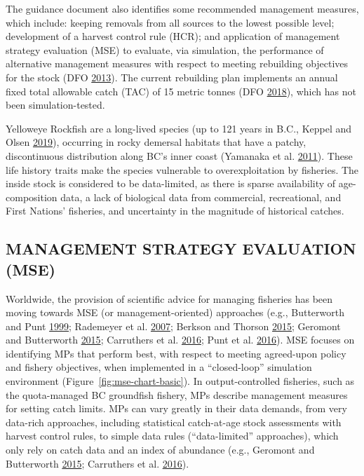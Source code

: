 \documentclass[11pt]{book}
\begin{document}
The guidance document also identifies some recommended management measures, which include: keeping removals from all sources to the lowest possible level; development of a harvest control rule (HCR); and application of management strategy evaluation (MSE) to evaluate, via simulation, the performance of alternative management measures with respect to meeting rebuilding objectives for the stock (DFO \protect\hyperlink{ref-dfo2013}{2013}). The current rebuilding plan implements an annual fixed total allowable catch (TAC) of 15 metric tonnes (DFO \protect\hyperlink{ref-ifmp2018}{2018}), which has not been simulation-tested.

Yelloweye Rockfish are a long-lived species (up to 121 years in B.C., Keppel and Olsen \protect\hyperlink{ref-keppel2019}{2019}), occurring in rocky demersal habitats that have a patchy, discontinuous distribution along BC's inner coast (Yamanaka et al. \protect\hyperlink{ref-yamanaka2011}{2011}). These life history traits make the species vulnerable to overexploitation by fisheries. The inside stock is considered to be data-limited, as there is sparse availability of age-composition data, a lack of biological data from commercial, recreational, and First Nations' fisheries, and uncertainty in the magnitude of historical catches.

\hypertarget{sec:introduction-mse}{%
\subsection{MANAGEMENT STRATEGY EVALUATION (MSE)}\label{sec:introduction-mse}}

Worldwide, the provision of scientific advice for managing fisheries has been moving towards MSE (or management-oriented) approaches (e.g., Butterworth and Punt \protect\hyperlink{ref-butterworth1999}{1999}; Rademeyer et al. \protect\hyperlink{ref-rademeyer2007}{2007}; Berkson and Thorson \protect\hyperlink{ref-berkson2015}{2015}; Geromont and Butterworth \protect\hyperlink{ref-geromont2015}{2015}; Carruthers et al. \protect\hyperlink{ref-carruthers2016}{2016}; Punt et al. \protect\hyperlink{ref-punt2016}{2016}). MSE focuses on identifying MPs that perform best, with respect to meeting agreed-upon policy and fishery objectives, when implemented in a ``closed-loop'' simulation environment (Figure~\ref{fig:mse-chart-basic}). In output-controlled fisheries, such as the quota-managed BC groundfish fishery, MPs describe management measures for setting catch limits. MPs can vary greatly in their data demands, from very data-rich approaches, including statistical catch-at-age stock assessments with harvest control rules, to simple data rules (``data-limited'' approaches), which only rely on catch data and an index of abundance (e.g., Geromont and Butterworth \protect\hyperlink{ref-geromont2015}{2015}; Carruthers et al. \protect\hyperlink{ref-carruthers2016}{2016}).
\end{document}
